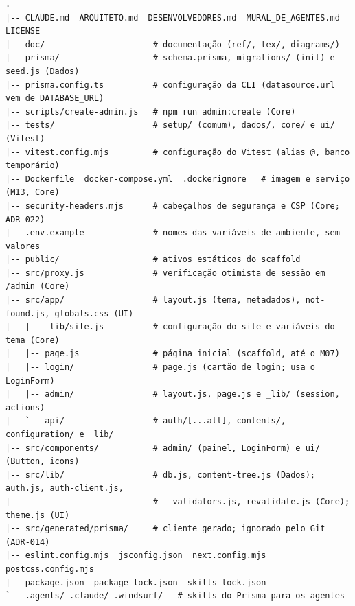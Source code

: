 \begin{lstlisting}[caption={Estrutura atual do repositório (verificada)}, label={lst:arvore-atual}]
.
|-- CLAUDE.md  ARQUITETO.md  DESENVOLVEDORES.md  MURAL_DE_AGENTES.md  LICENSE
|-- doc/                      # documentação (ref/, tex/, diagrams/)
|-- prisma/                   # schema.prisma, migrations/ (init) e seed.js (Dados)
|-- prisma.config.ts          # configuração da CLI (datasource.url vem de DATABASE_URL)
|-- scripts/create-admin.js   # npm run admin:create (Core)
|-- tests/                    # setup/ (comum), dados/, core/ e ui/ (Vitest)
|-- vitest.config.mjs         # configuração do Vitest (alias @, banco temporário)
|-- Dockerfile  docker-compose.yml  .dockerignore   # imagem e serviço (M13, Core)
|-- security-headers.mjs      # cabeçalhos de segurança e CSP (Core; ADR-022)
|-- .env.example              # nomes das variáveis de ambiente, sem valores
|-- public/                   # ativos estáticos do scaffold
|-- src/proxy.js              # verificação otimista de sessão em /admin (Core)
|-- src/app/                  # layout.js (tema, metadados), not-found.js, globals.css (UI)
|   |-- _lib/site.js          # configuração do site e variáveis do tema (Core)
|   |-- page.js               # página inicial (scaffold, até o M07)
|   |-- login/                # page.js (cartão de login; usa o LoginForm)
|   |-- admin/                # layout.js, page.js e _lib/ (session, actions)
|   `-- api/                  # auth/[...all], contents/, configuration/ e _lib/
|-- src/components/           # admin/ (painel, LoginForm) e ui/ (Button, icons)
|-- src/lib/                  # db.js, content-tree.js (Dados); auth.js, auth-client.js,
|                             #   validators.js, revalidate.js (Core); theme.js (UI)
|-- src/generated/prisma/     # cliente gerado; ignorado pelo Git (ADR-014)
|-- eslint.config.mjs  jsconfig.json  next.config.mjs  postcss.config.mjs
|-- package.json  package-lock.json  skills-lock.json
`-- .agents/ .claude/ .windsurf/   # skills do Prisma para os agentes
\end{lstlisting}

